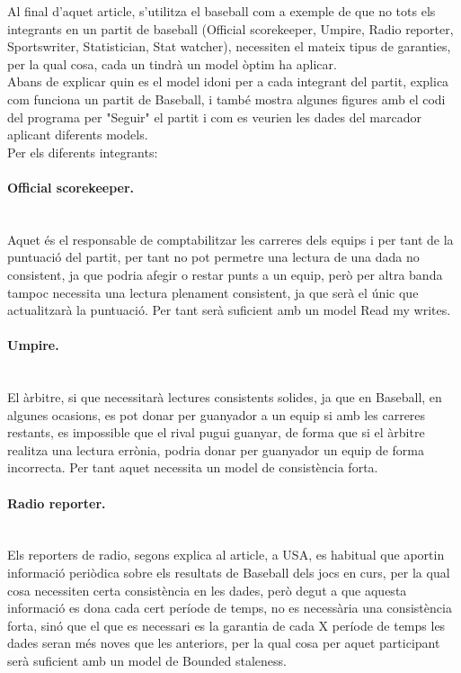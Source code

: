 \documentclass[a4paper, 10pt]{article}
\begin{document}
Al final d'aquet article, s'utilitza el baseball com a exemple de que no tots els integrants en un partit de baseball (Official scorekeeper, Umpire, Radio reporter, Sportswriter, Statistician, Stat watcher), necessiten el mateix tipus de garanties, per la qual cosa, cada un tindrà un model òptim ha aplicar.\\
Abans de explicar quin es el model idoni per a cada integrant del partit, explica com funciona un partit de Baseball, i també mostra algunes figures amb el codi del programa per "Seguir" el partit i com es veurien les dades del marcador aplicant diferents models.\\
Per els diferents integrants:

\newpage
\paragraph{Official scorekeeper.\\\\}
Aquet és el responsable de comptabilitzar les carreres dels equips i per tant de la puntuació del partit, per tant no pot permetre una lectura de una dada no consistent, ja que podria afegir o restar punts a un equip, però per altra banda tampoc necessita una lectura plenament consistent, ja que serà el únic que actualitzarà la puntuació. Per tant serà suficient amb un model Read my writes.
\paragraph{Umpire.\\\\}
El àrbitre, si que necessitarà lectures consistents solides, ja que en Baseball, en algunes ocasions, es pot donar per guanyador a un equip si amb les carreres restants, es impossible que el rival pugui guanyar, de forma que si el àrbitre realitza una lectura errònia, podria donar per guanyador un equip de forma incorrecta. Per tant aquet necessita un model de consistència forta.
\paragraph{Radio reporter.\\\\}
Els reporters de radio, segons explica al article, a USA, es habitual que aportin informació periòdica sobre els resultats de Baseball dels jocs en curs, per la qual cosa necessiten certa consistència en les dades, però degut a que aquesta informació es dona cada cert període de temps, no es necessària una consistència forta, sinó que el que es necessari es la garantia de cada X període de temps les dades seran més noves que les anteriors, per la qual cosa per aquet participant serà suficient amb un model de Bounded staleness.
\end{document}
